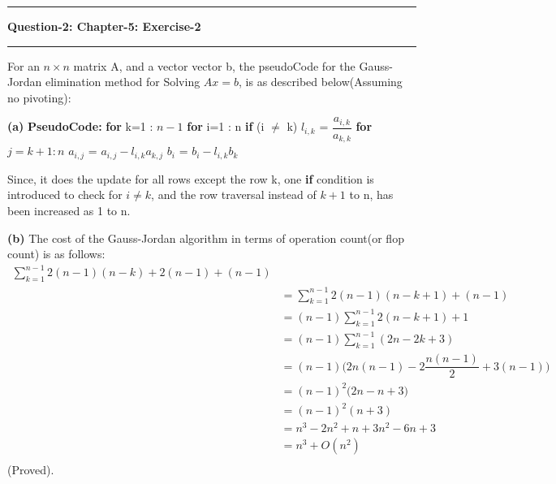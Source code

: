 \documentclass{article}
\newcommand\question[2]{\vspace{.25in}\hrule\textbf{#1: #2}\hrule\vspace{.10in}}
\renewcommand\part[1]{\vspace{.10in}\textbf{(#1)}}
\newcommand\pseudoCode{\vspace{.10in}\textbf{PseudoCode: }}
\begin{document}
\question{Question-2}{Chapter-5: Exercise-2}
For an $n \times n$ matrix A, and a vector vector b, the pseudoCode for the Gauss-Jordan elimination method for Solving $Ax = b$, is as described below(Assuming no pivoting):

\part{a}
\pseudoCode \newline
\hspace*{0.5cm} \textbf {for} k=1 : $n-1$ \newline
\hspace*{1cm}      \textbf {for} i=1 : n \newline
\hspace*{1.5cm}     \textbf {if} (i $\neq$ k) \newline
\hspace*{2cm}            $l_{i,k}$ = $\dfrac{a_{i,k}}{a_{k,k}}$ \newline
\hspace*{2cm}               \textbf {for} $j=k+1 : n$ \newline
\hspace*{2.5cm}               $ a_{i,j}$ =  $a_{i,j} - l_{i,k}a_{k,j}$ \newline
\hspace*{2cm}              $b_{i}$ = $b_{i} - l_{i,k}b_{k}$
  
  Since, it does the update for all rows except the row k, one \textbf{ if} condition is introduced to check for $i \neq k$, and the row traversal instead of $k+1$ to n, has been increased as 1 to n.



\part{b} The cost of the Gauss-Jordan algorithm in terms of operation count(or flop count) is as follows: \newline
\begin{align*}
  \sum_{k=1}^{n-1} 2(n-1)(n-k) + 2(n-1) + (n-1) \\
 &=\sum_{k=1}^{n-1} 2(n-1)(n-k+1) + (n-1) \\
&=(n-1) \sum_{k=1}^{n-1} 2(n-k+1) + 1 \\
&=(n-1) \sum_{k=1}^{n-1}(2n - 2k + 3) \\
&=(n-1) \bigg( 2n(n-1) -2\dfrac{n(n-1)}{2} + 3(n-1) \bigg) \\
&=(n-1)^2 \bigg( 2n - n + 3 \bigg) \\
&=(n-1)^2 ( n+3 ) \\
&=n^3 - 2n^2 + n + 3n^2 -6n + 3 \\
&= n^3 + O(n^2) \\
\end{align*}
(Proved).
\end{document}
